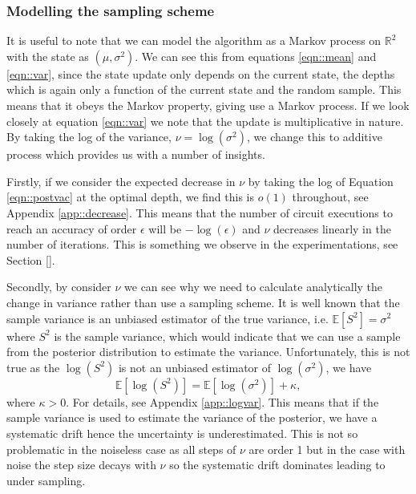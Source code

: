 \subsubsection{Modelling the sampling scheme}\label{sec::model}

It is useful to note that we can model the algorithm as a Markov process on $\mathbb{R}^2$ with the state as $(\mu,\sigma^2)$. We can see this from equations \ref{eqn::mean} and \ref{eqn::var}, since the state update only depends on the current state, the depths which is again only a function of the current state and the random sample. This means that it obeys the Markov property, giving use a Markov process. If we look closely at equation \ref{eqn::var} we note that the update is multiplicative in nature. By taking the log of the variance, $\nu=\log(\sigma^2)$, we change this to additive process which provides us with a number of insights.

Firstly, if we consider the expected decrease in $\nu$ by taking the log of Equation \ref{eqn::postvac} at the optimal depth, we find this is $o(1)$ throughout, see Appendix \ref{app::decrease}. This means that the number of circuit executions to reach an accuracy of order $\epsilon$ will be $-\log(\epsilon)$ and $\nu$ decreases linearly in the number of iterations. This is something we observe in the experimentations, see Section \ref{}.

Secondly, by consider $\nu$ we can see why we need to calculate analytically the change in variance rather than use a sampling scheme. It is well known that the sample variance is an unbiased estimator of the true variance, i.e. $\mathbb{E}\left[S^2\right]=\sigma^2$ where $S^2$ is the sample variance, which would indicate that we can use a sample from the posterior distribution to estimate the variance. Unfortunately, this is not true as the $\log(S^2)$ is not an unbiased estimator of $\log(\sigma^2)$, we have $$ \mathbb{E}\left[\log(S^2)\right] = \mathbb{E}\left[\log(\sigma^2)\right] +\kappa, $$ where $\kappa>0$. For details, see Appendix \ref{app::logvar}. This means that if the sample variance is used to estimate the variance of the posterior, we have a systematic drift hence the uncertainty is underestimated. This is not so problematic in the noiseless case as all steps of $\nu$ are order 1 but in the case with noise the step size decays with $\nu$ so the systematic drift dominates leading to under sampling.



